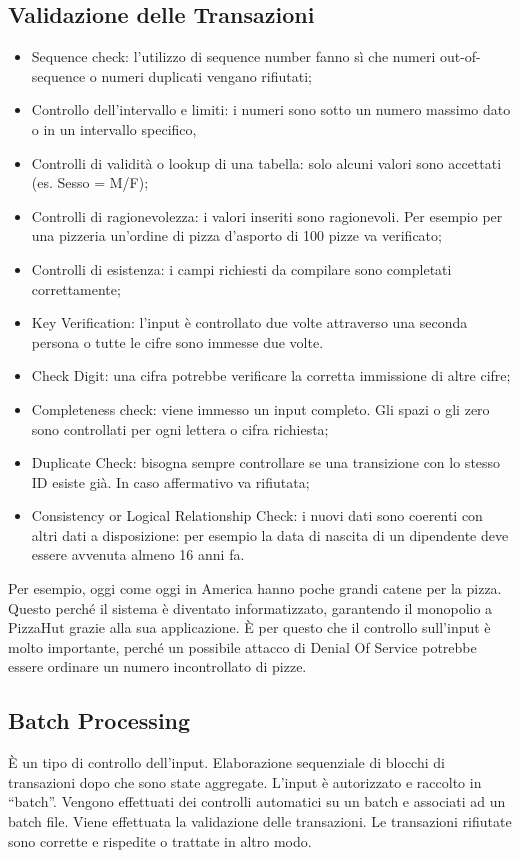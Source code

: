 \subsection{Validazione delle Transazioni}
\begin{itemize}
	\item Sequence check: l'utilizzo di sequence number fanno sì che numeri
	out-of-sequence o numeri duplicati vengano rifiutati;
	\item Controllo dell'intervallo e limiti: i numeri sono sotto un numero
	massimo dato o in un intervallo specifico,
	\item Controlli di validità o lookup di una tabella:
	solo alcuni valori sono accettati (es. Sesso = M/F);
	\item Controlli di ragionevolezza: i valori inseriti sono ragionevoli.
	Per esempio per una pizzeria un'ordine di pizza d'asporto di 100 pizze
	va verificato;
	\item Controlli di esistenza: i campi richiesti da compilare
	sono completati correttamente;
	\item Key Verification: l'input è controllato due volte attraverso
	una seconda persona o tutte le cifre sono immesse due volte.
	\item Check Digit: una cifra potrebbe verificare la corretta
	immissione di altre cifre;
	\item Completeness check: viene immesso un input completo. Gli
	spazi o gli zero sono controllati per ogni lettera o cifra
	richiesta;
	\item Duplicate Check: bisogna sempre controllare se una transizione
	con lo stesso ID esiste già. In caso affermativo va rifiutata;
	\item Consistency or Logical Relationship Check: i nuovi dati
	sono coerenti con altri dati a disposizione: per esempio
	la data di nascita di un dipendente deve essere avvenuta almeno
	16 anni fa.
\end{itemize}

Per esempio, oggi come oggi in America hanno poche grandi catene per la pizza.
Questo perché il sistema è diventato informatizzato, garantendo il monopolio a
PizzaHut grazie alla sua applicazione. È per questo che il controllo
sull'input è molto importante, perché un possibile attacco di Denial Of
Service potrebbe essere ordinare un numero incontrollato di pizze.





\subsection{Batch Processing}
È un tipo di controllo dell'input.
Elaborazione sequenziale di blocchi di transazioni
dopo che sono state aggregate.
L'input è autorizzato e raccolto in ``batch''. Vengono effettuati
dei controlli automatici su un batch e associati ad un batch file.
Viene effettuata la validazione delle transazioni. Le transazioni
rifiutate sono corrette e rispedite o trattate in altro modo.

